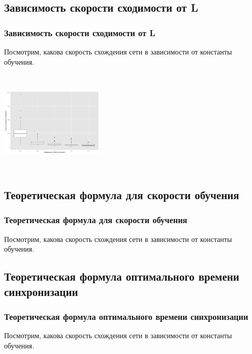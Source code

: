 \documentclass{beamer}
\begin{document}
\subsection{Зависимость скорости сходимости от L}
\begin{frame}
\frametitle{Зависимость скорости сходимости от L}
Посмотрим, какова скорость схождения сети в зависимости от константы обучения.

\begin{center}
\includegraphics[width=5cm, height=5cm]{../../plots/eta_vs_speed.png}

\end{center}
\end{frame}

\subsection{Теоретическая формула для скорости обучения}
\begin{frame}
\frametitle{Теоретическая формула для скорости обучения}
Посмотрим, какова скорость схождения сети в зависимости от константы обучения.

\end{frame}

\subsection{Теоретическая формула оптимального времени синхронизации}
\begin{frame}
\frametitle{Теоретическая формула оптимального времени синхронизации}
Посмотрим, какова скорость схождения сети в зависимости от константы обучения.

\end{frame}
\end{document}
